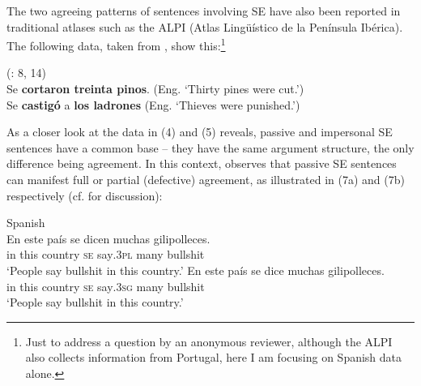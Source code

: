 \documentclass[output=paper]{langsci/langscibook}
\begin{document}
The two agreeing patterns of sentences involving SE have also been reported in traditional atlases such as the ALPI (Atlas Lingüístico de la Península Ibérica). The following data, taken from \citet{Benito2010}, show this:\footnote{Just to address a question by an anonymous reviewer, although the ALPI also collects information from Portugal, here I am focusing on Spanish data alone.} 

\ea%
    (\citealt{Benito2010}: 8, 14)
    \label{ex:gallego:6}\\
    \ea Se \textbf{cortaron treinta pinos}. (Eng. ‘Thirty pines were cut.’)\\
    \ex Se \textbf{castigó} a \textbf{los ladrones} (Eng. ‘Thieves were punished.’)\\
    \z
\z

As a closer look at the data in (4) and (5) reveals, passive and impersonal SE sentences have a common base – they have the same argument structure, the only difference being agreement. In this context, \citet[§26.3.2.2]{Mendikoetxea1999} observes that passive SE sentences can manifest full or partial (defective) agreement, as illustrated in (7a) and (7b) respectively (cf. \citealt{Martín1979} for discussion):

\ea%
    Spanish\label{ex:gallego:7}\\
    \ea
    \gll En  este  país        se   dicen       muchas  gilipolleces.       \\
         in   this   country  \textsc{se}  say\textsc{{}.3pl}  many     bullshit\\
    \glt ‘People say bullshit in this country.’
    \ex
    \gll En  este  país        se   dice        muchas  gilipolleces.       \\
         in   this   country  \textsc{se} say\textsc{{}.3sg}  many     bullshit \\
    \glt ‘People say bullshit in this country.’
    \z
\z
\end{document}
